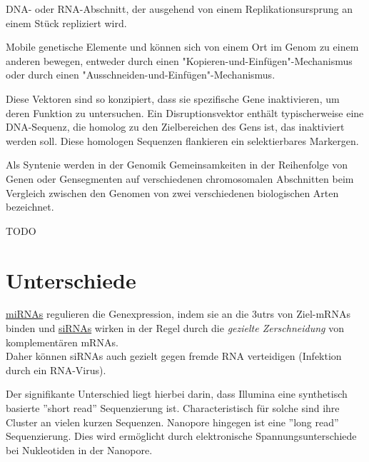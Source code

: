 DNA- oder RNA-Abschnitt, der ausgehend von einem Replikationsursprung an einem Stück repliziert wird. \\ \newline

Mobile genetische Elemente und können sich von einem Ort im Genom zu einem anderen bewegen, entweder durch einen "Kopieren-und-Einfügen"-Mechanismus oder durch einen "Ausschneiden-und-Einfügen"-Mechanismus. \\ \newline

Diese Vektoren sind so konzipiert, dass sie spezifische Gene inaktivieren, um deren Funktion zu untersuchen. Ein Disruptionsvektor enthält typischerweise eine DNA-Sequenz, die homolog zu den Zielbereichen des Gens ist, das inaktiviert werden soll. Diese homologen Sequenzen flankieren ein selektierbares Markergen.  \\ \newline

Als Syntenie werden in
der Genomik Gemeinsamkeiten in der Reihenfolge von Genen oder Gensegmenten auf verschiedenen chromosomalen Abschnitten beim Vergleich zwischen den Genomen von zwei verschiedenen biologischen Arten bezeichnet. \\ \newline

TODO


\section{Unterschiede}
 \underline{miRNAs} regulieren die Genexpression, indem sie an die \glspl{3utr} von Ziel-mRNAs binden und \underline{siRNAs} wirken in der Regel durch die \textit{gezielte Zerschneidung} von komplementären mRNAs.  \\
 Daher können siRNAs auch gezielt gegen fremde RNA verteidigen (Infektion durch ein \gls{RNA-Virus}). \\ \newline

Der signifikante Unterschied liegt hierbei darin, dass Illumina eine synthetisch
basierte ”short read” Sequenzierung ist. Characteristisch für solche sind ihre
Cluster an vielen kurzen Sequenzen.
Nanopore hingegen ist eine ”long read” Sequenzierung. Dies wird ermöglicht
durch elektronische Spannungsunterschiede bei Nukleotiden in der Nanopore. \\ \newline

